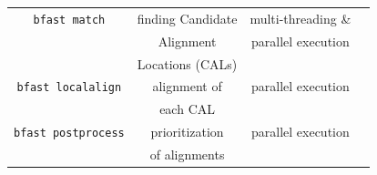 \documentclass{cpeauth}
\begin{document}
\begin{figure}
\begin{floatrow}
{\begin{tabular}{|c|c|c|c|}
  \hline
\texttt{bfast match} & finding Candidate   &  multi-threading \& \\

& Alignment &  parallel execution \\
& Locations (CALs) & \\\hline
\texttt{bfast localalign} & alignment of&   parallel execution \\
&  each CAL   & \\

  \hline
\texttt{bfast postprocess} & prioritization   &  parallel execution \\ 
& of alignments & \\
\hline


\hline
\end{tabular}

}{
}
\end{floatrow}
\label{fig:bfast-summary}
\end{figure}
\end{document}
